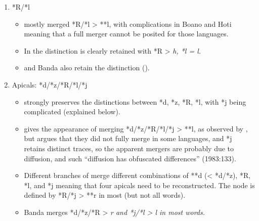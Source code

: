 \begin{enumerate}
\begin{itemize}[topsep=0pt,leftmargin=\dimexpr 15pt-6pt]
		\end{itemize}
	\item	*R/*l
		\begin{itemize}[topsep=0pt,leftmargin=\dimexpr 15pt-6pt]
			\item	{} mostly merged *R/*l > **l,
						with complications in Boano
						and Hoti meaning that a full merger cannot be posited for those languages.
			\item	In  the distinction is clearly retained with
						*R > \it{h}, *l = \it{l}.
			\item	{}
						and Banda also retain the distinction ().
		\end{itemize}
	\item	Apicals: *d/*z/*R/*l/*j
		\begin{itemize}[topsep=0pt,leftmargin=\dimexpr 15pt-6pt]
			\item	{} strongly preserves the distinctions between
						*d, *z, *R, *l, with *j being complicated (explained below).
			\item	{} gives the appearance of merging *d/*z/*R/*l/*j
						> **l, as observed by \citet{Stresemann1927},
						but \citet{Collins1983} argues that they did not fully merge
						in some languages, and *j retains distinct traces,
						so the apparent mergers are probably due to diffusion,
						and such “diffusion has obfuscated differences” (1983:133).
			\item	Different branches of  merge different
						combinations of **d (< *d/*z),
						*R, *l, and *j meaning that four apicals need to be reconstructed.
						The  node is defined by *R/*j > **r in
						most (but not all words).
			\item	Banda merges *d/*z/*R > \it{r}
						and *j/*l > \it{l} in most words.
		\end{itemize}
\end{enumerate}

